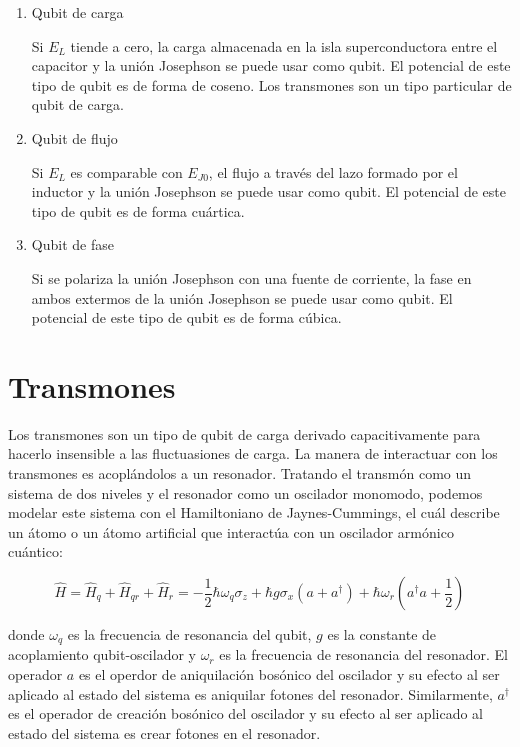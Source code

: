 \begin{enumerate}
    \item Qubit de carga

        Si $E_L$ tiende a cero, la carga almacenada en la isla superconductora entre el capacitor y  la unión Josephson se puede usar como qubit. El potencial de este tipo de qubit es de forma de coseno. Los transmones son un tipo particular de qubit de carga.

    \item Qubit de flujo

        Si $E_L$ es comparable con $E_{J0}$, el flujo a través del lazo formado por el inductor y la unión Josephson se puede usar como qubit. El potencial de este tipo de qubit es de forma cuártica.

    \item Qubit de fase

        Si se polariza la unión Josephson con una fuente de corriente, la fase en ambos extermos de la unión Josephson se puede usar como qubit. El potencial de este tipo de qubit es de forma cúbica.
\end{enumerate}

\section{Transmones}

Los transmones son un tipo de qubit de carga derivado capacitivamente para hacerlo insensible a las fluctuasiones de carga. La manera de interactuar con los transmones es acoplándolos a un resonador. Tratando el transmón como un sistema de dos niveles y el resonador como un oscilador monomodo, podemos modelar este sistema con el Hamiltoniano de Jaynes-Cummings, el cuál describe un átomo o un átomo artificial que interactúa con un oscilador armónico cuántico:

\begin{equation}
    \hat{H} = \hat{H}_q + \hat{H}_{qr} + \hat{H}_r = -\frac{1}{2} \hbar \omega_q \sigma_z + \hbar g \sigma_x (a+a^\dag) + \hbar \omega_r (a^\dag a + \frac{1}{2})
\end{equation}

donde $\omega_q$ es la frecuencia de resonancia del qubit, $g$ es la constante de acoplamiento qubit-oscilador y $\omega_r$ es la frecuencia de resonancia del resonador. El operador $a$ es el operdor de aniquilación bosónico del oscilador y su efecto al ser aplicado al estado del sistema es aniquilar fotones del resonador. Similarmente, $a^\dagger$ es el operador de creación bosónico del oscilador y su efecto al ser aplicado al estado del sistema es crear fotones en el resonador.

